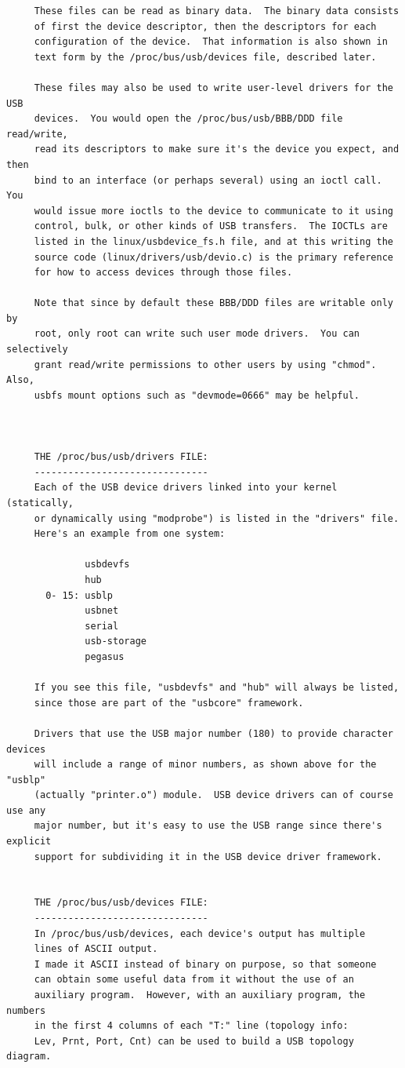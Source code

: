 {{{{{{{{{{{{\begin{verbatim}
     These files can be read as binary data.  The binary data consists
     of first the device descriptor, then the descriptors for each
     configuration of the device.  That information is also shown in
     text form by the /proc/bus/usb/devices file, described later.
     
     These files may also be used to write user-level drivers for the USB
     devices.  You would open the /proc/bus/usb/BBB/DDD file read/write,
     read its descriptors to make sure it's the device you expect, and then
     bind to an interface (or perhaps several) using an ioctl call.  You
     would issue more ioctls to the device to communicate to it using
     control, bulk, or other kinds of USB transfers.  The IOCTLs are
     listed in the linux/usbdevice_fs.h file, and at this writing the
     source code (linux/drivers/usb/devio.c) is the primary reference
     for how to access devices through those files.
     
     Note that since by default these BBB/DDD files are writable only by
     root, only root can write such user mode drivers.  You can selectively
     grant read/write permissions to other users by using "chmod".  Also,
     usbfs mount options such as "devmode=0666" may be helpful.
     
     
     
     THE /proc/bus/usb/drivers FILE:
     -------------------------------
     Each of the USB device drivers linked into your kernel (statically,
     or dynamically using "modprobe") is listed in the "drivers" file.
     Here's an example from one system:
     
              usbdevfs
              hub
       0- 15: usblp
              usbnet
              serial
              usb-storage
              pegasus
     
     If you see this file, "usbdevfs" and "hub" will always be listed,
     since those are part of the "usbcore" framework.
     
     Drivers that use the USB major number (180) to provide character devices
     will include a range of minor numbers, as shown above for the "usblp"
     (actually "printer.o") module.  USB device drivers can of course use any
     major number, but it's easy to use the USB range since there's explicit
     support for subdividing it in the USB device driver framework.
     
     
     THE /proc/bus/usb/devices FILE:
     -------------------------------
     In /proc/bus/usb/devices, each device's output has multiple
     lines of ASCII output.
     I made it ASCII instead of binary on purpose, so that someone
     can obtain some useful data from it without the use of an
     auxiliary program.  However, with an auxiliary program, the numbers
     in the first 4 columns of each "T:" line (topology info:
     Lev, Prnt, Port, Cnt) can be used to build a USB topology diagram.
     

\end{verbatim}}}}}}}}}}}}}
